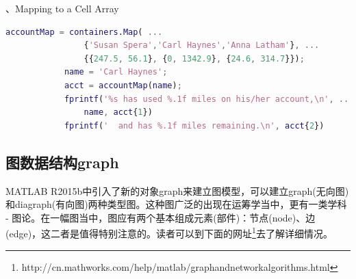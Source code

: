             、Mapping to a Cell Array
            \begin{lstlisting}[language=Matlab]
            accountMap = containers.Map( ...
                {'Susan Spera','Carl Haynes','Anna Latham'}, ...
                {{247.5, 56.1}, {0, 1342.9}, {24.6, 314.7}});
            name = 'Carl Haynes';
            acct = accountMap(name);
            fprintf('%s has used %.1f miles on his/her account,\n', ...
                name, acct{1})
            fprintf('  and has %.1f miles remaining.\n', acct{2})
            \end{lstlisting}
    \subsection{图数据结构graph}
        \par
        MATLAB R2015b中引入了新的对象graph来建立图模型，可以建立graph(无向图)和diagraph(有向图)两种类型图。这种图广泛的出现在运筹学当中，更有一类学科 - 图论。在一幅图当中，图应有两个基本组成元素(部件)：节点(node)、边(edge)，这二者是值得特别注意的。读者可以到下面的网址\footnote{http://cn.mathworks.com/help/matlab/graphandnetworkalgorithms.html}去了解详细情况。
